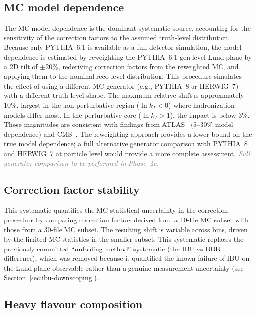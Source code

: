 \documentclass[11pt,a4paper]{article}
\newcommand{\tbd}[1]{\textcolor{gray}{\textit{#1}}}
\begin{document}
\subsection{MC model dependence}
\label{sec:syst-model}

The MC model dependence is the dominant systematic source, accounting
for the sensitivity of the correction factors to the assumed
truth-level distribution.  Because only PYTHIA~6.1 is available as a
full detector simulation, the model dependence is estimated by
reweighting the PYTHIA~6.1 gen-level Lund plane by a 2D tilt of
$\pm 20\%$, rederiving correction factors from the reweighted MC, and
applying them to the nominal reco-level distribution.  This procedure
simulates the effect of using a different MC generator (e.g.,
PYTHIA~8 or HERWIG~7) with a different truth-level shape.  The maximum
relative shift is approximately 10\%, largest in the non-perturbative
region ($\ln k_T < 0$) where hadronization models differ most.  In the
perturbative core ($\ln k_T > 1$), the impact is below 3\%.  These
magnitudes are consistent with findings from ATLAS~\cite{ATLAS:2020bbn}
(5--30\% model dependence) and CMS~\cite{CMS:2024mlf}.  The
reweighting approach provides a lower bound on the true model
dependence; a full alternative generator comparison with PYTHIA~8 and
HERWIG~7 at particle level would provide a more complete
assessment.  \tbd{Full generator comparison to be performed in
Phase~4c.}

\subsection{Correction factor stability}
\label{sec:syst-corr-stability}

This systematic quantifies the MC statistical uncertainty in the
correction procedure by comparing correction factors derived from a
10-file MC subset with those from a 30-file MC subset.  The resulting
shift is variable across bins, driven by the limited MC statistics in
the smaller subset.  This systematic replaces the previously committed
``unfolding method'' systematic (the IBU-vs-BBB difference), which was
removed because it quantified the known failure of IBU on the Lund plane
observable rather than a genuine measurement uncertainty (see
Section~\ref{sec:ibu-downscoping}).

\subsection{Heavy flavour composition}
\label{sec:syst-heavy-flavour}
\end{document}
